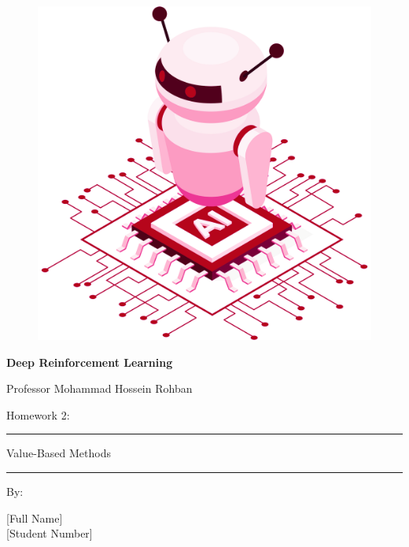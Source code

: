 \documentclass[12pt]{article}
\begin{document}
\thispagestyle{plain}

\begin{center}

\vspace*{-1.5cm}
\begin{figure}[!h]
    \centering
    \includegraphics[width=0.7\linewidth]{figs/cover-std.png}
\end{figure}

{

{\color{DarkBlue} {\fontsize{30}{50} \textbf{
Deep Reinforcement Learning
}}}

{\color{DarkBlue} {\Large
Professor Mohammad Hossein Rohban
}}
}


\vspace{20pt}

{


{\color{RedOrange}
{\Large
Homework 2:
}\\
}
{\color{BrickRed}
\rule{12cm}{0.5pt}

{\Huge
Value-Based Methods
}
\rule{12cm}{0.5pt}
}

\vspace{10pt}

{\color{RoyalPurple} { \small By:} } \\
\vspace{10pt}

{\color{Blue} { \LARGE [Full Name] } } \\
\vspace{5pt}
{\color{RoyalBlue} { \Large [Student Number] } }


}
\end{center}
\end{document}
